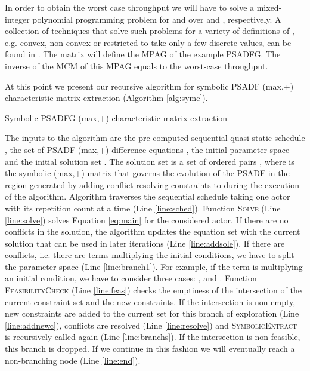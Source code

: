 \documentclass[]{eptcs}
\begin{document}
In order to obtain the worst case throughput we will have to solve a mixed-integer polynomial programming problem for  and  over  and , respectively. A collection of techniques that solve such problems for a variety of definitions of , e.g. convex, non-convex or restricted to take only a few discrete values, can be found in \cite{2sher:all}. The matrix  will define the MPAG of the example PSADFG. The inverse of the MCM of this MPAG equals to the worst-case throughput.

At this point we present our recursive algorithm for symbolic PSADF (max,+) characteristic matrix extraction (Algorithm \ref{alg:syme}).
\begin{algorithm}[!ht]
\caption{Symbolic PSADFG (max,+) characteristic matrix extraction}\label{alg:syme}
\begin{algorithmic}[1]
	\State 
	\While{} \label{line:sched}
		\State 
		\State  \label{line:solve}
		
		\If{}
			\State  \label{line:branch}
			\While{} 	\label{line:branch1}
				 \label{line:feas}
					\State 
					\State 	\label{line:addnewc}
					\State 
					\State 	\label{line:resolve}
					\State  \label{line:branchs}
				\EndIf
			\EndWhile
		\Else
			\State  \label{line:addsole}
		\EndIf
	\EndWhile\label{schedulewhile}
	\If{}
		\State  \Return  \label{line:end}
	\Else \State \Return  \label{line:bla}
	\EndIf
\EndFunction
\end{algorithmic}
\end{algorithm}
\nopagebreak
The inputs to the algorithm are the pre-computed sequential quasi-static schedule , the set of PSADF (max,+) difference equations , the initial parameter space  and the initial solution set . The solution set  is a set of ordered pairs , where  is the symbolic (max,+) matrix that governs the evolution of the PSADF in the region  generated by adding conflict resolving constraints to  during the execution of the algorithm.
Algorithm traverses the sequential schedule taking one actor with its repetition count at a time (Line \ref{line:sched}). Function \textsc{Solve} (Line \ref{line:solve}) solves Equation \eqref{eq:main} for the considered actor. If there are no conflicts in the solution, the algorithm updates the equation set with the current solution that can be used in later iterations (Line \ref{line:addsole}). If there are conflicts, i.e. there are  terms multiplying the initial conditions, we have to split the parameter space (Line \ref{line:branch1}). For example, if the term  is multiplying an initial condition, we have to consider three cases: ,  and . Function \textsc{FeasibilityCheck} (Line \ref{line:feas}) checks the emptiness of the intersection of the current constraint set  and the new constraints. If the intersection is non-empty, new constraints are added to the current set for this branch of exploration (Line \ref{line:addnewc}), conflicts are resolved (Line \ref{line:resolve}) and \textsc{SymbolicExtract} is recursively called again (Line \ref{line:branchs}). If the intersection is non-feasible, this branch is dropped. If we continue in this fashion we will eventually reach a non-branching node (Line \ref{line:end}).
\end{document}
